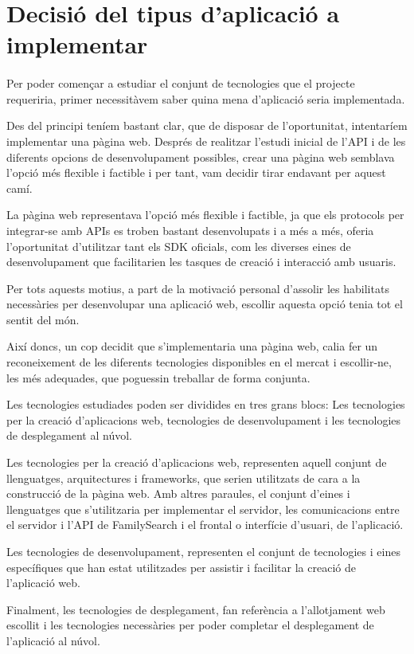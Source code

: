 \section{Decisió del tipus d'aplicació a implementar}

    \paragraph{}
    Per poder començar a estudiar el conjunt de tecnologies que el projecte requeriria, primer necessitàvem saber quina mena d'aplicació seria implementada.

    Des del principi teníem bastant clar, que de disposar de l’oportunitat, intentaríem implementar una pàgina web. Després de realitzar l’estudi inicial de l’API i de les diferents opcions de desenvolupament possibles, crear una pàgina web semblava l’opció més flexible i factible i per tant, vam decidir tirar endavant per aquest camí.

    La pàgina web representava l’opció més flexible i factible, ja que els protocols per integrar-se amb APIs es troben bastant desenvolupats i a més a més, oferia l’oportunitat d’utilitzar tant els SDK oficials, com les diverses eines de desenvolupament que facilitarien les tasques de creació i interacció amb usuaris.

    Per tots aquests motius, a part de la motivació personal d’assolir les habilitats necessàries per desenvolupar una aplicació web, escollir aquesta opció tenia tot el sentit del món.

    Així doncs, un cop decidit que s'implementaria una pàgina web, calia fer un reconeixement de les diferents tecnologies disponibles en el mercat i escollir-ne, les més adequades, que poguessin treballar de forma conjunta.

    Les tecnologies estudiades poden ser dividides en tres grans blocs: Les tecnologies per la creació d’aplicacions web, tecnologies de desenvolupament i les tecnologies de desplegament al núvol.

    Les tecnologies per la creació d’aplicacions web, representen aquell conjunt de llenguatges, arquitectures i frameworks, que serien utilitzats de cara a la construcció de la pàgina web. Amb altres paraules, el conjunt d’eines i llenguatges que s’utilitzaria per implementar el servidor, les comunicacions entre el servidor i l’API de FamilySearch i el frontal o interfície d'usuari, de l’aplicació.

    Les tecnologies de desenvolupament, representen el conjunt de tecnologies i eines específiques que han estat utilitzades per assistir i facilitar la creació de l’aplicació web.

    Finalment, les tecnologies de desplegament, fan referència a l'allotjament web escollit i les tecnologies necessàries per poder completar el desplegament de l’aplicació al núvol.

